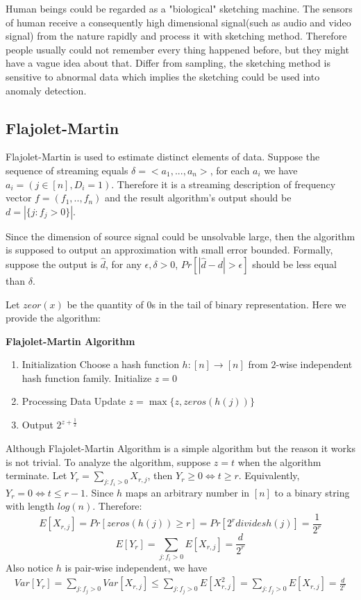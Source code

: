 \documentclass[CJK, a4paper]{cctart}
\begin{document}
Human beings could be regarded as a "biological" sketching machine. The sensors of human receive a consequently high dimensional signal(such as audio and video signal) from the nature rapidly and process it with sketching method. Therefore people usually could not remember every thing happened before, but they might have a vague idea about that. Differ from sampling, the sketching method is sensitive to abnormal data which implies the sketching could be used into anomaly detection. 

\subsection{Flajolet-Martin}
Flajolet-Martin is used to estimate distinct elements of data. Suppose the sequence of streaming equals $\delta = <a_1, ..., a_n>$, for each $a_i$ we have $a_i = (j \in [n], D_i = 1)$. Therefore it is a streaming description of frequency vector $f = (f_1, .., f_n)$ and the result algorithm's output should be $d = |\{j : f_j > 0\}|$.

Since the dimension of source signal could be unsolvable large, then the algorithm is supposed to output an approximation with small error bounded. Formally, suppose the output is $\hat{d}$, for any $\epsilon, \delta > 0$, $Pr[|\hat{d}-d|>\epsilon]$ should be less equal than $\delta$.

Let $zeor(x)$ be the quantity of $0$s in the tail of binary representation. Here we provide the algorithm:

\textbf{Flajolet-Martin Algorithm}
\begin{enumerate}
\item Initialization
\subitem Choose a hash function $h:[n] \rightarrow [n]$ from $2$-wise independent hash function family.
\subitem Initialize $z = 0$
\item Processing Data
\subitem Update $z = \max\{z, zeros(h(j))\}$
\item Output
\subitem $2^{z+\frac{1}{2}}$
\end{enumerate}
Although Flajolet-Martin Algorithm is a simple algorithm but the reason it works is not trivial. To analyze the algorithm, suppose $z = t$ when the algorithm terminate. Let $Y_r = \sum_{j:f_i>0}X_{r,j}$, then $Y_r \ge 0 \Leftrightarrow t \ge r$. Equivalently, $Y_r = 0 \Leftrightarrow t \le r - 1$. Since $h$ maps an arbitrary number in $[n]$ to a binary string with length $log(n)$. Therefore:
$$E[X_{r, j}] = Pr[zeros(h(j)) \ge r] = Pr[2^r divides h(j)] = \frac{1}{2^r}$$
$$E[Y_r] = \sum_{j:f_i > 0}E[X_{r,j}] = \frac{d}{2^r}$$
Also notice $h$ is pair-wise independent, we have
\begin{eqnarray*}
Var[Y_r] = \sum_{j:f_j>0}Var[X_{r,j}]
\le \sum_{j:f_j>0}E[X^2_{r,j}]
=\sum_{j:f_j>0}E[X_{r, j}]
=\frac{d}{2^r}
\end{eqnarray*}
\end{document}
